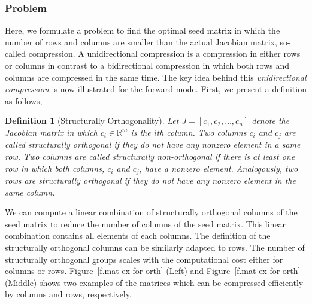 \documentclass[12pt, twoside,a4paper,toc=bibliography]{scrbook}
\newtheorem{definition}{Definition}
\newcommand{\figref}[1]{Figure~\protect\ref{#1}}
\newcommand{\setR}{\ensuremath{\mathbb{R}}}
\begin{document}
\subsubsection{Problem}
\label{ss.problem.full}
Here, we formulate a problem to find the optimal seed matrix in which
the number of rows and columns are smaller than the actual Jacobian matrix, so-called compression.
A unidirectional compression is a compression in either rows or columns in contrast to
a bidirectional compression in which both rows and columns are compressed in the same time.
The key idea behind this \emph{unidirectional compression} is now illustrated for the
forward mode. First, we present a definition as follows,
\begin{definition}[Structurally Orthogonality]
\label{d:struct_orth}
Let $J=[c_1, c_2, \dots, c_n]$ denote the Jacobian matrix in which $c_i \in \setR^m$ is the $i$th
column. Two columns $c_i$ and $c_j$ are
called \emph{structurally orthogonal} if they do not have any nonzero element in a same
row. Two columns are called \emph{structurally non-orthogonal} if there is at least one
row in which both columns, $c_i$ and $c_j$, have a nonzero element.
Analogously, two rows are
\emph{structurally orthogonal} if they do not have any nonzero element in the same column.
\end{definition}
We can compute a linear combination of structurally orthogonal columns of the seed matrix
to reduce the number of columns of the seed matrix. This linear combination contains all elements of each columns. The definition of the structurally orthogonal columns can be similarly adapted to rows. The number of structurally orthogonal groups scales with the computational cost either for columns or rows.
\figref{f.mat-ex-for-orth} (Left) and \figref{f.mat-ex-for-orth} (Middle) shows two examples
of the matrices which can be compressed efficiently by columns and rows, respectively.
\end{document}
